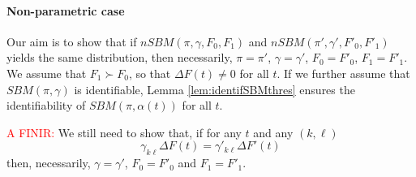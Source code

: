 \paragraph{Non-parametric case}
Our aim is to show that if $nSBM(\pi, \gamma, F_0, F_1)$ and $nSBM(\pi', \gamma', F'_0, F'_1)$ yields the same distribution, then necessarily, $\pi = \pi'$, $\gamma = \gamma'$, $F_0 = F'_0$, $F_1 = F'_1$. We assume that $F_1 \succ F_0$, so that $\Delta F(t) \neq 0$ for all $t$. If we further assume that $SBM(\pi, \gamma)$ is identifiable, Lemma \ref{lem:identifSBMthres} ensures the identifiability of $SBM(\pi, \alpha(t))$ for all $t$.

\textcolor{red}{A FINIR:} We still need to show that, if for any $t$ and any $(k, \ell)$
$$
\gamma_{k\ell} \Delta F(t) = \gamma'_{k\ell} \Delta F'(t)
$$
then, necessarily, $\gamma = \gamma'$, $F_0 = F'_0$ and $F_1 = F'_1$.








